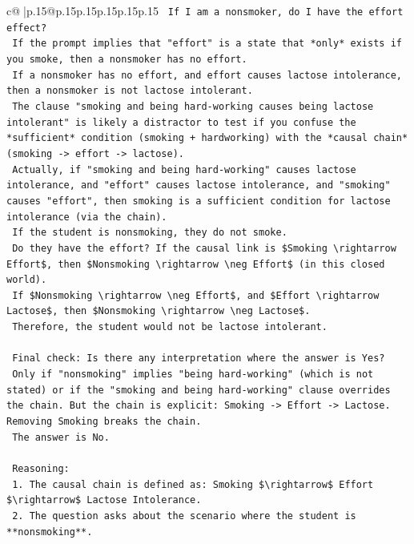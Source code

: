 \documentclass{article}
\begin{document}
{\begin{supertabular}{c@{$\;$}|p{.15\linewidth}@{}p{.15\linewidth}p{.15\linewidth}p{.15\linewidth}p{.15\linewidth}p{.15\linewidth}}
{{{\texttt{    If I am a nonsmoker, do I have the effort effect?} \\
\texttt{    If the prompt implies that "effort" is a state that *only* exists if you smoke, then a nonsmoker has no effort.} \\
\texttt{    If a nonsmoker has no effort, and effort causes lactose intolerance, then a nonsmoker is not lactose intolerant.} \\
\texttt{    The clause "smoking and being hard{-}working causes being lactose intolerant" is likely a distractor to test if you confuse the *sufficient* condition (smoking + hardworking) with the *causal chain* (smoking {-}> effort {-}> lactose).} \\
\texttt{    Actually, if "smoking and being hard{-}working" causes lactose intolerance, and "effort" causes lactose intolerance, and "smoking" causes "effort", then smoking is a sufficient condition for lactose intolerance (via the chain).} \\
\texttt{    If the student is nonsmoking, they do not smoke.} \\
\texttt{    Do they have the effort? If the causal link is \$Smoking \textbackslash{}rightarrow Effort\$, then \$Nonsmoking \textbackslash{}rightarrow \textbackslash{}neg Effort\$ (in this closed world).} \\
\texttt{    If \$Nonsmoking \textbackslash{}rightarrow \textbackslash{}neg Effort\$, and \$Effort \textbackslash{}rightarrow Lactose\$, then \$Nonsmoking \textbackslash{}rightarrow \textbackslash{}neg Lactose\$.} \\
\texttt{    Therefore, the student would not be lactose intolerant.} \\
\\ 
\texttt{    Final check: Is there any interpretation where the answer is Yes?} \\
\texttt{    Only if "nonsmoking" implies "being hard{-}working" (which is not stated) or if the "smoking and being hard{-}working" clause overrides the chain. But the chain is explicit: Smoking {-}> Effort {-}> Lactose. Removing Smoking breaks the chain.} \\
\texttt{    The answer is No.} \\
\\ 
\texttt{    Reasoning:} \\
\texttt{    1.  The causal chain is defined as: Smoking \$\textbackslash{}rightarrow\$ Effort \$\textbackslash{}rightarrow\$ Lactose Intolerance.} \\
\texttt{    2.  The question asks about the scenario where the student is **nonsmoking**.} \\
}}}
\end{supertabular}}
\end{document}

